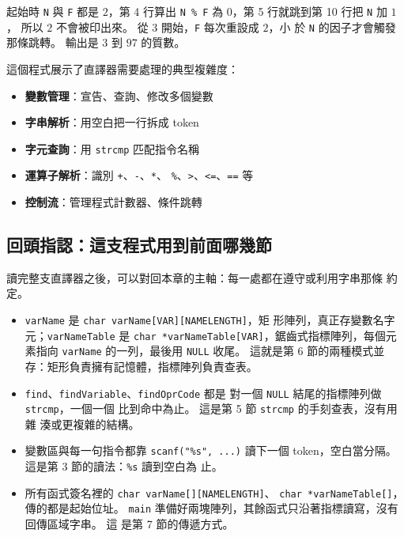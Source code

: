 起始時 \texttt{N} 與 \texttt{F} 都是 $2$，第 4 行算出
\texttt{N \% F} 為 $0$，第 5 行就跳到第 10 行把 \texttt{N} 加 $1$，
所以 $2$ 不會被印出來。 從 $3$ 開始，\texttt{F} 每次重設成 $2$，小
於 \texttt{N} 的因子才會觸發那條跳轉。 輸出是 $3$ 到 $97$ 的質數。

這個程式展示了直譯器需要處理的典型複雜度：
\begin{itemize}
\item \textbf{變數管理}：宣告、查詢、修改多個變數
\item \textbf{字串解析}：用空白把一行拆成 token
\item \textbf{字元查詢}：用 \texttt{strcmp} 匹配指令名稱
\item \textbf{運算子解析}：識別 \texttt{+}、\texttt{-}、\texttt{*}、
      \texttt{\%}、\texttt{>}、\texttt{<=}、\texttt{==} 等
\item \textbf{控制流}：管理程式計數器、條件跳轉
\end{itemize}

\subsection[回頭指認：對照前面學過的內容]{回頭指認：這支程式用到前面哪幾節}

讀完整支直譯器之後，可以對回本章的主軸：每一處都在遵守或利用字串那條
約定。

\begin{itemize}
\item \texttt{varName} 是 \texttt{char varName[VAR][NAMELENGTH]}，矩
      形陣列，真正存變數名字元；\texttt{varNameTable} 是
      \texttt{char *varNameTable[VAR]}，鋸齒式指標陣列，每個元素指向
      \texttt{varName} 的一列，最後用 \texttt{NULL} 收尾。 這就是第 6
      節的兩種模式並存：矩形負責擁有記憶體，指標陣列負責查表。
\item \texttt{find}、\texttt{findVariable}、\texttt{findOprCode} 都是
      對一個 \texttt{NULL} 結尾的指標陣列做 \texttt{strcmp}，一個一個
      比到命中為止。 這是第 5 節 \texttt{strcmp} 的手刻查表，沒有用雜
      湊或更複雜的結構。
\item 變數區與每一句指令都靠 \texttt{scanf("\%s", ...)} 讀下一個
      token，空白當分隔。 這是第 3 節的讀法：\texttt{\%s} 讀到空白為
      止。
\item 所有函式簽名裡的 \texttt{char varName[][NAMELENGTH]}、
      \texttt{char *varNameTable[]}，傳的都是起始位址。 \texttt{main}
      準備好兩塊陣列，其餘函式只沿著指標讀寫，沒有回傳區域字串。 這
      是第 7 節的傳遞方式。
\end{itemize}

